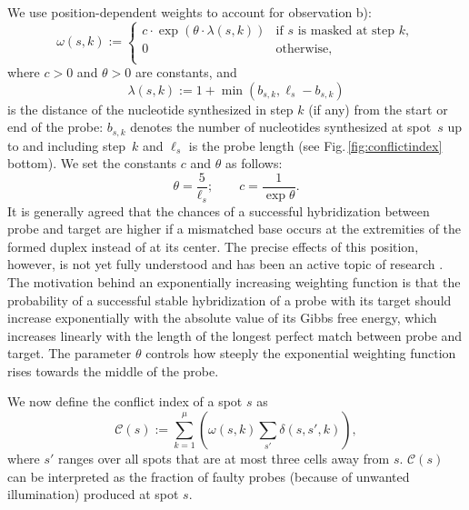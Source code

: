 \documentclass{llncs}
\begin{document}
We use position-dependent weights to account for observation b):
\begin{equation}\label{eq:pos_mult}
\omega(s,k) :=
        \left\{
                \begin{array}{ll}
                        c \cdot \exp{\left(\theta \cdot \lambda(s,k)\right)} & \mbox{if $s$ is masked at step $k$}, \\
                        0 & \mbox{otherwise}, \\
                \end{array}
        \right.
\end{equation}
where $c>0$ and $\theta>0$ are constants, and
\begin{equation}\label{eq:base_pos}
  \lambda(s,k) := 1 + \min(b_{s,k},\ell_{s} - b_{s,k})
\end{equation}
is the distance of the nucleotide synthesized in step $k$ (if any)
from the start or end of the probe: $b_{s,k}$ denotes the number of
nucleotides synthesized at spot~$s$ up to and including step~$k$ and
$\ell_s$ is the probe length (see Fig.\,\ref{fig:conflictindex}
bottom). We set the constants $c$ and $\theta$ as follows:
\[ \theta = \frac{5}{\ell_s}; \qquad c = \frac{1}{\exp{\theta}}. \]
It is generally agreed that the chances of a successful hybridization
between probe and target are higher if a mismatched base occurs at the
extremities of the formed duplex instead of at its center. The precise
effects of this position, however, is not yet fully understood and has
been an active topic of research \cite{BINDER05}. The motivation
behind an exponentially increasing weighting function is that the
probability of a successful stable hybridization of a probe with its
target should increase exponentially with the absolute value of its
Gibbs free energy, which increases linearly with the length of the
longest perfect match between probe and target. The parameter $\theta$
controls how steeply the exponential weighting function rises towards
the middle of the probe.

We now define the conflict index of a spot $s$ as
\begin{equation}
\label{eq:conf_idx}
\mathcal{C}(s) := \sum_{k=1}^{\mu} \left( \omega(s,k) \sum_{s'} \delta(s,s',k) \right),
\end{equation}
where $s'$ ranges over all spots that are at most three cells away
from $s$.  $\mathcal{C}(s)$ can be interpreted as the fraction of
faulty probes (because of unwanted illumination) produced at spot $s$.
\end{document}
